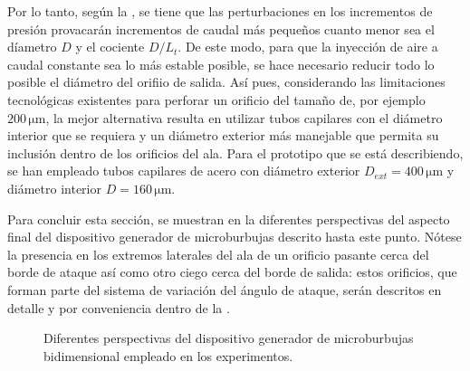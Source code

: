 Por lo tanto, según la , se tiene que las perturbaciones en los incrementos de presión provacarán incrementos de caudal más pequeños cuanto menor sea el díametro $D$ y el cociente $D/L_{t}$. De este modo, para que la inyección de aire a caudal constante sea lo más estable posible, se hace necesario reducir todo lo posible el diámetro del orifiio de salida. Así pues, considerando las limitaciones tecnológicas existentes para perforar un orificio del tamaño de, por ejemplo $200\,\mathrm{\mu m}$, la mejor alternativa resulta en utilizar tubos capilares con el diámetro interior que se requiera y un diámetro exterior más manejable que permita su inclusión dentro de los orificios del ala. Para el prototipo que se está describiendo, se han empleado tubos capilares de acero con diámetro exterior $D_{ext} = 400\,\mathrm{\mu m}$ y diámetro interior $D = 160\, \mathrm{\mu m}$. 

Para concluir esta sección, se muestran en la  diferentes perspectivas del aspecto final del dispositivo generador de microburbujas descrito hasta este punto. Nótese la presencia en los extremos laterales del ala de un orificio pasante cerca del borde de ataque así como otro ciego cerca del borde de salida: estos orificios, que forman parte del sistema de variación del ángulo de ataque, serán descritos en detalle y por conveniencia dentro de la . 

\begin{figure}
\centering
{}
\caption{Diferentes perspectivas del dispositivo generador de microburbujas bidimensional empleado en los experimentos.}
\end{figure}



